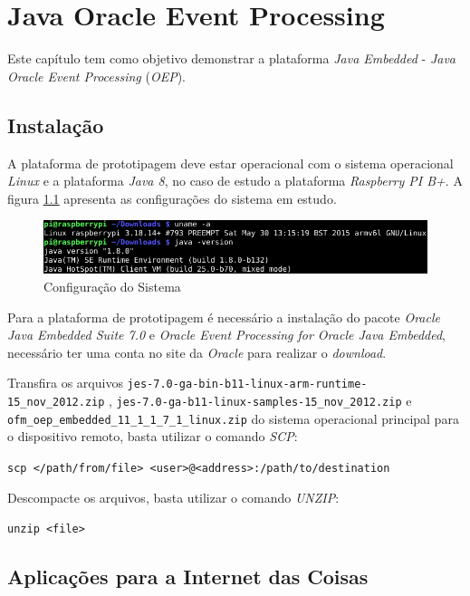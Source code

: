 %

\chapter{Java Oracle Event Processing}

Este capítulo tem como objetivo demonstrar a plataforma \textit{Java Embedded} 
- \textit{Java Oracle Event Processing} (\textit{OEP}).

\section{Instalação}

A plataforma de prototipagem deve estar operacional com o sistema operacional 
\textit{Linux} e a plataforma \textit{Java 8}, no caso de estudo a plataforma 
\textit{Raspberry PI B+}. A figura \ref{fig:oep/configuracao} apresenta as 
configurações do sistema em estudo.

\begin{figure}[H]
    \centering
    \includegraphics[width=0.7\linewidth]{figuras/java/configuracao}
    \caption{Configuração do Sistema}
    \label{fig:oep/configuracao}
\end{figure}

Para a plataforma de prototipagem é necessário a instalação do pacote 
\textit{Oracle Java Embedded Suite 7.0} e \textit{Oracle Event Processing for 
Oracle Java Embedded}, necessário ter uma conta no site da 
\textit{Oracle} para realizar o \textit{download}.

Transfira os arquivos \newline
\verb|jes-7.0-ga-bin-b11-linux-arm-runtime-15_nov_2012.zip|
, \newline
\verb|jes-7.0-ga-b11-linux-samples-15_nov_2012.zip|
e \newline
\verb|ofm_oep_embedded_11_1_1_7_1_linux.zip|
 do sistema operacional principal para o dispositivo remoto, basta utilizar o 
comando \textit{SCP}:

\verb|scp </path/from/file> <user>@<address>:/path/to/destination|

Descompacte os arquivos, basta utilizar o comando \textit{UNZIP}:

\verb|unzip <file>|

\section{Aplicações para a Internet das Coisas}

